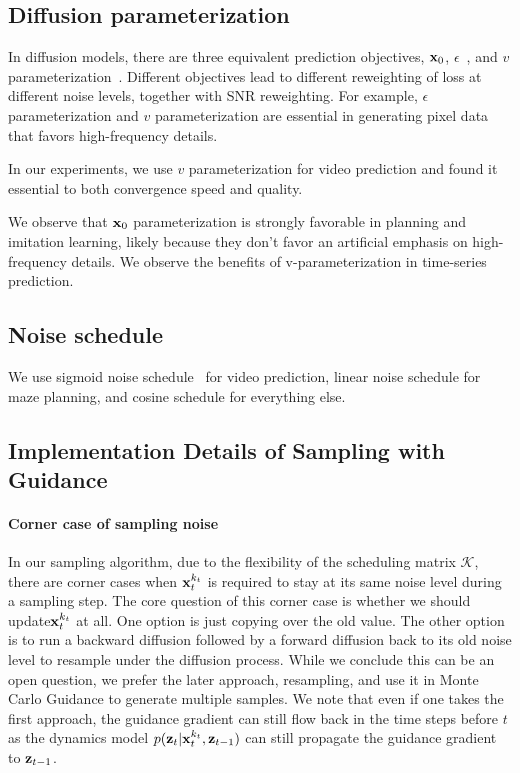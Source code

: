 \subsection{Diffusion parameterization}
In diffusion models, there are three equivalent prediction objectives, $\mathbf{x}_0$, $\epsilon$~\cite{ho2020denoising}, and $v$ parameterization~\cite{vparameterization}.  Different objectives lead to different reweighting of loss at different noise levels, together with SNR reweighting. For example, $\epsilon$ parameterization and $v$ parameterization are essential in generating pixel data that favors high-frequency details. 

In our experiments, we use $v$ parameterization for video prediction and found it essential to both convergence speed and quality.

We observe that $\mathbf{x}_0$ parameterization is strongly favorable in planning and imitation learning, likely because they don't favor an artificial emphasis on high-frequency details. We observe the benefits of v-parameterization in time-series prediction.



\subsection{Noise schedule}
We use sigmoid noise schedule~\cite{chen2023importance} for video prediction, linear noise schedule for maze planning, and cosine schedule for everything else. 

\subsection{Implementation Details of Sampling with Guidance}


\paragraph{Corner case of sampling noise}
\label{app:corner_case}
In our sampling algorithm, due to the flexibility of the scheduling matrix $\mathcal{K}$, there are corner cases when $\mathbf{x}_t^{k_t}$ is required to stay at its same noise level during a sampling step. The core question of this corner case is whether we should update$\mathbf{x}_t^{k_t}$ at all. One option is just copying over the old value. The other option is to run a backward diffusion followed by a forward diffusion back to its old noise level to resample under the diffusion process. While we conclude this can be an open question, we prefer the later approach, resampling, and use it in Monte Carlo Guidance to generate multiple samples. We note that even if one takes the first approach, the guidance gradient can still flow back in the time steps before $t$ as the dynamics model $p(\mathbf{z}_t|\mathbf{x}_t^{k_t}, \mathbf{z}_{t-1})$ can still propagate the guidance gradient to $\mathbf{z}_{t-1}$.

